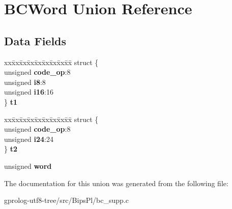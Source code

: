 \hypertarget{unionBCWord}{}\section{B\+C\+Word Union Reference}
\label{unionBCWord}
\subsection*{Data Fields}
\begin{DoxyCompactItemize}
\item 
\begin{tabbing}
xx\=xx\=xx\=xx\=xx\=xx\=xx\=xx\=xx\=\kill
struct \{\\
\>unsigned {\bfseries code\_op}:8\\
\>unsigned {\bfseries i8}:8\\
\>unsigned {\bfseries i16}:16\\
\} {\bfseries t1}\hypertarget{unionBCWord_a70e755edbb220fd93df2c19803233c99}{}\label{unionBCWord_a70e755edbb220fd93df2c19803233c99}
\\

\end{tabbing}\item 
\begin{tabbing}
xx\=xx\=xx\=xx\=xx\=xx\=xx\=xx\=xx\=\kill
struct \{\\
\>unsigned {\bfseries code\_op}:8\\
\>unsigned {\bfseries i24}:24\\
\} {\bfseries t2}\hypertarget{unionBCWord_abbf0ee87987d69cb8a46e49454401f7c}{}\label{unionBCWord_abbf0ee87987d69cb8a46e49454401f7c}
\\

\end{tabbing}\item 
unsigned {\bfseries word}\hypertarget{unionBCWord_ae6b64a6557710fc6e57ebbd02d1a3bc1}{}\label{unionBCWord_ae6b64a6557710fc6e57ebbd02d1a3bc1}

\end{DoxyCompactItemize}


The documentation for this union was generated from the following file\+:\begin{DoxyCompactItemize}
\item 
gprolog-\/utf8-\/tree/src/\+Bips\+Pl/bc\+\_\+supp.\+c\end{DoxyCompactItemize}
